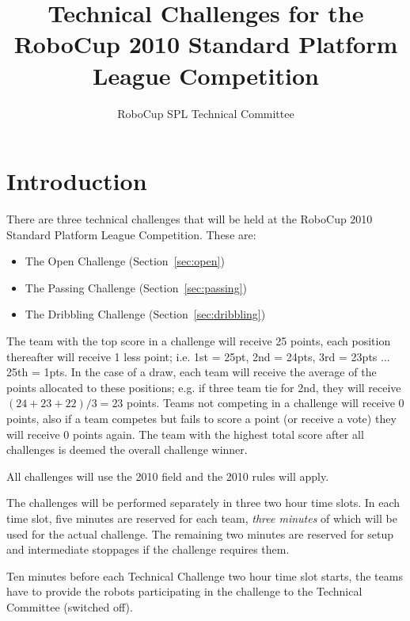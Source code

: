 \documentclass{article}
\begin{document}
\title{Technical Challenges for the RoboCup 2010 Standard Platform League Competition}

\author{RoboCup SPL Technical Committee}

\maketitle

\section{Introduction}
\label{sec:introduction}

There are three technical challenges that will be held at the RoboCup 
2010 Standard Platform League Competition. These are:

\begin{itemize}
\item The Open Challenge (Section~\ref{sec:open})
\item The Passing Challenge (Section~\ref{sec:passing})
\item The Dribbling Challenge (Section~\ref{sec:dribbling})
\end{itemize}

The team with the top score in a challenge will receive 25 points, each 
position thereafter will receive 1 less point; i.e. 1st = 25pt, 2nd = 24pts, 
3rd = 23pts ... 25th = 1pts. In the case of a draw, each team will receive 
the average of the points allocated to these positions; e.g. if three team 
tie for 2nd, they will receive $(24+23+22)/3 = 23$ points. Teams not competing 
in a challenge will receive 0 points, also if a team competes but fails to 
score a point (or receive a vote) they will receive 0 points again. The team 
with the highest total score after all challenges is deemed the overall 
challenge winner.

All challenges will use the 2010 field and the 2010 rules will apply.

The challenges will be performed separately in three two hour time slots. 
In each time slot, five minutes are reserved for each team, \emph{three minutes} 
of which will be used for the actual challenge. The remaining two minutes are 
reserved for setup and intermediate stoppages if the challenge requires them.

Ten minutes before each Technical Challenge two hour time slot starts, the teams 
have to provide the robots participating in the challenge to the Technical Committee 
(switched off).
\end{document}
